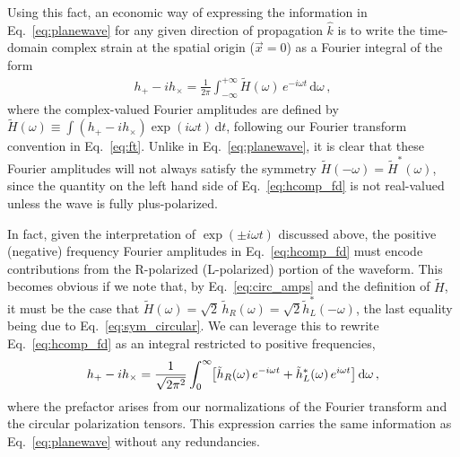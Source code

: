 \documentclass[aps,prd,twocolumn,superscriptaddress,preprintnumbers,floatfix,nofootinbib]{revtex4-2}
\newcommand{\infd}{\mathrm{d}}
\begin{document}
Using this fact, an economic way of expressing the information in Eq.~\eqref{eq:planewave} for any given direction of propagation $\hat{k}$ is to write the time-domain complex strain at the spatial origin ($\vec{x}=0$) as a Fourier integral of the form
\begin{align} \label{eq:hcomp_fd}
h_+ - i h_\times = \frac{1}{2\pi} \int_{-\infty}^{+\infty} \tilde{H}(\omega)\, e^{-i \omega t} \,\infd \omega \, ,
\end{align}
where the complex-valued Fourier amplitudes are defined by $\tilde{H}(\omega) \equiv \int (h_+ - i h_\times) \exp(i\omega t)\, \infd t$, following our Fourier transform convention in Eq.~\eqref{eq:ft}.
Unlike in Eq.~\eqref{eq:planewave}, it is clear that these Fourier amplitudes will not always satisfy the symmetry $\tilde{H}(-\omega) = \tilde{H}^*(\omega)$, since the quantity on the left hand side of Eq.~\eqref{eq:hcomp_fd} is not real-valued unless the wave is fully plus-polarized.

In fact, given the interpretation of $\exp(\pm i \omega t)$ discussed above, the positive (negative) frequency Fourier amplitudes in Eq.~\eqref{eq:hcomp_fd} must encode contributions from the R-polarized (L-polarized) portion of the waveform.
This becomes obvious if we note that, by Eq.~\eqref{eq:circ_amps} and the definition of $\tilde{H}$, it must be the case that $\tilde{H}(\omega) = \sqrt{2}\, \tilde{h}_R (\omega) = \sqrt{2} \tilde{h}_L^*(-\omega)$, the last equality being due to Eq.~\eqref{eq:sym_circular}.
We can leverage this to rewrite Eq.~\eqref{eq:hcomp_fd} as an integral restricted to positive frequencies,
\begin{align} \label{eq:hcomp_fd_rl}
h_+ - i h_\times = \frac{1}{\sqrt{2\pi^2}} \int_{0}^{\infty} \hspace{-2.5pt} \left[ \tilde{h}_R(\omega)\, e^{-i \omega t} + \tilde{h}_L^*(\omega)\, e^{i \omega t}\right] \infd \omega \, ,
\end{align}
where the prefactor arises from our normalizations of the Fourier transform and the circular polarization tensors.
This expression carries the same information as Eq.~\eqref{eq:planewave} without any redundancies.
\end{document}
